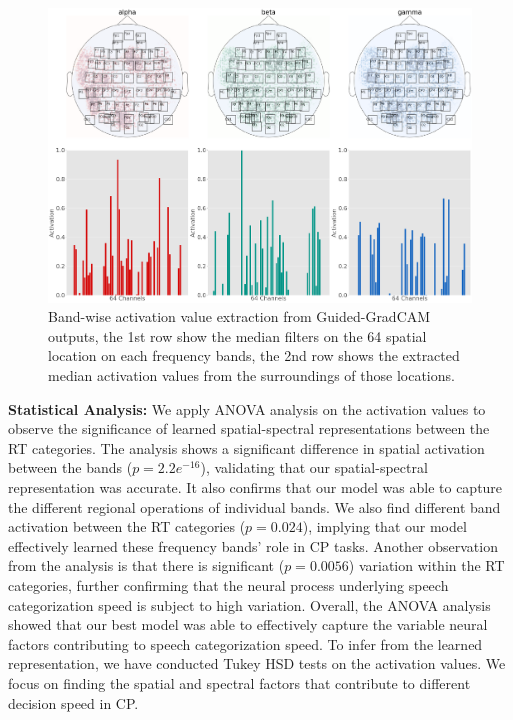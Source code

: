 \documentclass{article}
\begin{document}
\begin{figure}[ht]
\vskip 0.2in
\begin{center}
\centerline{\includegraphics[width=\columnwidth]{Images/saliency_score_cal_ggbp}}
\caption[Activation maps from GradCAM and Guided-GradCAM]{Band-wise activation value extraction from Guided-GradCAM outputs, the 1st row show the median filters on the 64 spatial location on each frequency bands, the 2nd row shows the extracted median activation values from the surroundings of those locations.}
\end{center}
\vskip -0.2in
\label{ggbp_cal}
\end{figure}

\textbf{Statistical Analysis:} We apply ANOVA analysis on the activation values to observe the significance of learned spatial-spectral representations between the RT categories. The analysis shows a significant difference in spatial activation between the bands ($p = 2.2e^{-16}$), validating that our spatial-spectral representation was accurate. It also confirms that our model was able to capture the different regional operations of individual bands. We also find different band activation between the RT categories ($p = 0.024$), implying that our model effectively learned these frequency bands' role in CP tasks. Another observation from the analysis is that there is significant ($p = 0.0056$) variation within the RT categories, further confirming that the neural process underlying speech categorization speed is subject to high variation. Overall, the ANOVA analysis showed that our best model was able to effectively capture the variable neural factors contributing to speech categorization speed. To infer from the learned representation, we have conducted Tukey HSD tests on the activation values. We focus on finding the spatial and spectral factors that contribute to different decision speed in CP.
\end{document}
